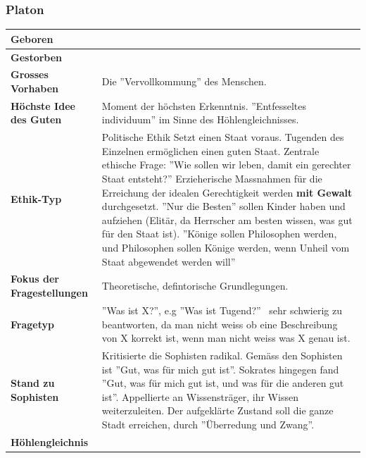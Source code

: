 		\subsubsection{Platon}
			\begin{longtable}{>{\bfseries}p{}p{}}
				\hline
				Geboren
					& \\
				\hline
				Gestorben
					& \\
				\hline
				Grosses Vorhaben
					& Die ''Vervollkommung'' des Menschen.\\
				\hline
				Höchste Idee des Guten
					& Moment der höchsten Erkenntnis. ''Entfesseltes individuum'' im Sinne des Höhlengleichnisses.\\
				\hline
				Ethik-Typ
					& Politische Ethik\newline
						Setzt einen Staat voraus.\newline
						Tugenden des Einzelnen ermöglichen einen guten Staat.\newline
						Zentrale ethische Frage: ''Wie sollen wir leben, damit ein gerechter Staat entsteht?''\newline
						Erzieherische Massnahmen für die Erreichung der idealen Gerechtigkeit werden \textbf{mit Gewalt} durchgesetzt.\newline
						''Nur die Besten'' sollen Kinder haben und aufziehen (Elitär, da Herrscher am besten wissen, was gut für den Staat ist).\newline
						''Könige sollen Philosophen werden, und Philosophen sollen Könige werden, wenn Unheil vom Staat abgewendet werden will''\\
				\hline
				Fokus der Fragestellungen
					& Theoretische, defintorische Grundlegungen.\\
				\hline
				Fragetyp
					& ''Was ist X?'', e.g ''Was ist Tugend?''\newline
						\textrightarrow\ sehr schwierig zu beantworten, da man nicht weiss ob eine Beschreibung von X korrekt ist, wenn man nicht weiss was X genau ist.\\
				\hline
				Stand zu Sophisten
					& Kritisierte die Sophisten radikal.\newline
					  Gemäss den Sophisten ist ''Gut, was für mich gut ist''.\newline
					  Sokrates hingegen fand ''Gut, was für mich gut ist, und was für die anderen gut ist''.\newline
					  Appellierte an Wissensträger, ihr Wissen weiterzuleiten.\newline
					  Der aufgeklärte Zustand soll die ganze Stadt erreichen, durch ''Überredung und Zwang''.\\
				\hline
				Höhlengleichnis
					&	\vspace{0pt}
						

\end{longtable}

